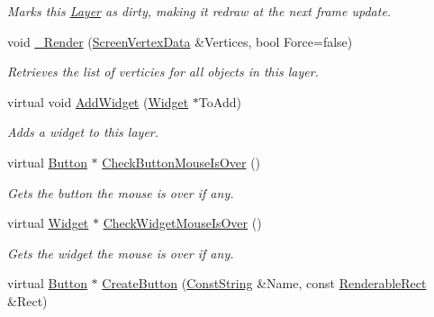 \begin{DoxyCompactItemize}
\begin{DoxyCompactList}\small\item\em Marks this \hyperlink{classMezzanine_1_1UI_1_1Layer}{Layer} as dirty, making it redraw at the next frame update. \item\end{DoxyCompactList}\item 
void \hyperlink{classMezzanine_1_1UI_1_1Layer_a477e9da0a01828455dad7d9f23b804bb}{\_\-Render} (\hyperlink{classMezzanine_1_1UI_1_1ScreenVertexData}{ScreenVertexData} \&Vertices, bool Force=false)
\begin{DoxyCompactList}\small\item\em Retrieves the list of verticies for all objects in this layer. \item\end{DoxyCompactList}\item 
virtual void \hyperlink{classMezzanine_1_1UI_1_1Layer_a930991c1e3d5906fc9d347ca281084ab}{AddWidget} (\hyperlink{classMezzanine_1_1UI_1_1Widget}{Widget} $\ast$ToAdd)
\begin{DoxyCompactList}\small\item\em Adds a widget to this layer. \item\end{DoxyCompactList}\item 
virtual \hyperlink{classMezzanine_1_1UI_1_1Button}{Button} $\ast$ \hyperlink{classMezzanine_1_1UI_1_1Layer_a5f53df62a577dbbbb279248e8c9d1673}{CheckButtonMouseIsOver} ()
\begin{DoxyCompactList}\small\item\em Gets the button the mouse is over if any. \item\end{DoxyCompactList}\item 
virtual \hyperlink{classMezzanine_1_1UI_1_1Widget}{Widget} $\ast$ \hyperlink{classMezzanine_1_1UI_1_1Layer_af3353560fdd740f172492807fff4b98f}{CheckWidgetMouseIsOver} ()
\begin{DoxyCompactList}\small\item\em Gets the widget the mouse is over if any. \item\end{DoxyCompactList}\item 
virtual \hyperlink{classMezzanine_1_1UI_1_1Button}{Button} $\ast$ \hyperlink{classMezzanine_1_1UI_1_1Layer_a15606e99cf9cf34cb991556d87f1c44e}{CreateButton} (\hyperlink{namespaceMezzanine_a63cd699ac54b73953f35ec9cfc05e506}{ConstString} \&Name, const \hyperlink{structMezzanine_1_1UI_1_1RenderableRect}{RenderableRect} \&Rect)

\end{DoxyCompactItemize}
